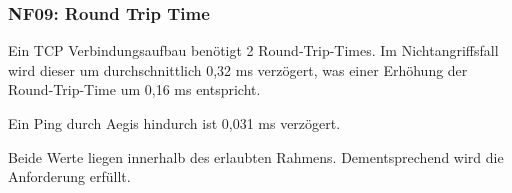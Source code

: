 \documentclass[../review_3.tex]{subfiles}
\begin{document}
\subsubsection{NF09: Round Trip Time}
Ein TCP Verbindungsaufbau benötigt 2 Round-Trip-Times. Im Nichtangriffsfall wird dieser um durchschnittlich 0,32 ms verzögert, was einer Erhöhung der Round-Trip-Time um 0,16 ms entspricht.

Ein Ping durch Aegis hindurch ist 0,031 ms verzögert.

Beide Werte liegen innerhalb des erlaubten Rahmens. Dementsprechend wird die Anforderung erfüllt.
\end{document}
